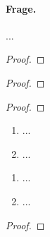 \documentclass[12pt]{scrreprt}
\begin{document}
\paragraph{Frage.} ...

\begin{thm}\label{thm:fnkt.zws}

\end{thm}
\begin{proof}

\end{proof}

\begin{kor}\label{kor:fnkt.nst}

\end{kor}
\begin{proof}

\end{proof}

\begin{kor}\label{kor:fnkt.intervallsatz}

\end{kor}
\begin{proof}

\end{proof}

\begin{bsp}\label{bsp:fnkt.nst-intsatz-bsp}
\begin{enumerate}
\item ...\label{bsp:fnkt.nst-intsatz-bsp.a}
\item ...\label{bsp:fnkt.nst-intsatz-bsp.b}
\end{enumerate}
\end{bsp}

\begin{dfn}\label{dfn:fnkt.} %

\end{dfn}

\begin{bsp*}
\begin{enumerate}
\item ...
\item ...
\end{enumerate}
\end{bsp*}

\begin{bem}\label{}

\end{bem}
\begin{proof}

\end{proof}
\end{document}
